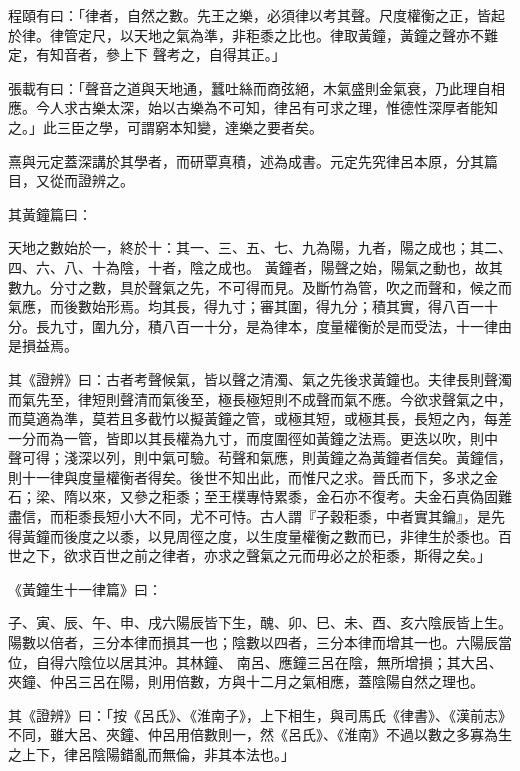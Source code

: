 \begin{pinyinscope}
 程頤有曰：「律者，自然之數。先王之樂，必須律以考其聲。尺度權衡之正，皆起於律。律管定尺，以天地之氣為準，非秬黍之比也。律取黃鐘，黃鐘之聲亦不難定，有知音者，參上下
 聲考之，自得其正。」



 張載有曰：「聲音之道與天地通，蠶吐絲而商弦絕，木氣盛則金氣衰，乃此理自相應。今人求古樂太深，始以古樂為不可知，律呂有可求之理，惟德性深厚者能知之。」此三臣之學，可謂窮本知變，達樂之要者矣。



 熹與元定蓋深講於其學者，而研覃真積，述為成書。元定先究律呂本原，分其篇目，又從而證辨之。



 其黃鐘篇曰：



 天地之數始於一，終於十：其一、三、五、七、九為陽，九者，陽之成也；其二、四、六、八、十為陰，十者，陰之成也。
 黃鐘者，陽聲之始，陽氣之動也，故其數九。分寸之數，具於聲氣之先，不可得而見。及斷竹為管，吹之而聲和，候之而氣應，而後數始形焉。均其長，得九寸；審其圍，得九分；積其實，得八百一十分。長九寸，圍九分，積八百一十分，是為律本，度量權衡於是而受法，十一律由是損益焉。



 其《證辨》曰：古者考聲候氣，皆以聲之清濁、氣之先後求黃鐘也。夫律長則聲濁而氣先至，律短則聲清而氣後至，極長極短則不成聲而氣不應。今欲求聲氣之中，而莫適為準，莫若且多截竹以擬黃鐘之管，或極其短，或極其長，長短之內，每差一分而為一管，皆即以其長權為九寸，而度圍徑如黃鐘之法焉。更迭以吹，則中
 聲可得；淺深以列，則中氣可驗。茍聲和氣應，則黃鐘之為黃鐘者信矣。黃鐘信，則十一律與度量權衡者得矣。後世不知出此，而惟尺之求。晉氏而下，多求之金石；梁、隋以來，又參之秬黍；至王樸專恃累黍，金石亦不復考。夫金石真偽固難盡信，而秬黍長短小大不同，尤不可恃。古人謂『子穀秬黍，中者實其鑰』，是先得黃鐘而後度之以黍，以見周徑之度，以生度量權衡之數而已，非律生於黍也。百世之下，欲求百世之前之律者，亦求之聲氣之元而毋必之於秬黍，斯得之矣。」



 《黃鐘生十一律篇》曰：



 子、寅、辰、午、申、戌六陽辰皆下生，醜、卯、巳、未、酉、亥六陰辰皆上生。陽數以倍者，三分本律而損其一也；陰數以四者，三分本律而增其一也。六陽辰當位，自得六陰位以居其沖。其林鐘、
 南呂、應鐘三呂在陰，無所增損；其大呂、夾鐘、仲呂三呂在陽，則用倍數，方與十二月之氣相應，蓋陰陽自然之理也。



 其《證辨》曰：「按《呂氏》、《淮南子》，上下相生，與司馬氏《律書》、《漢前志》不同，雖大呂、夾鐘、仲呂用倍數則一，然《呂氏》、《淮南》不過以數之多寡為生之上下，律呂陰陽錯亂而無倫，非其本法也。」




\end{pinyinscope}
